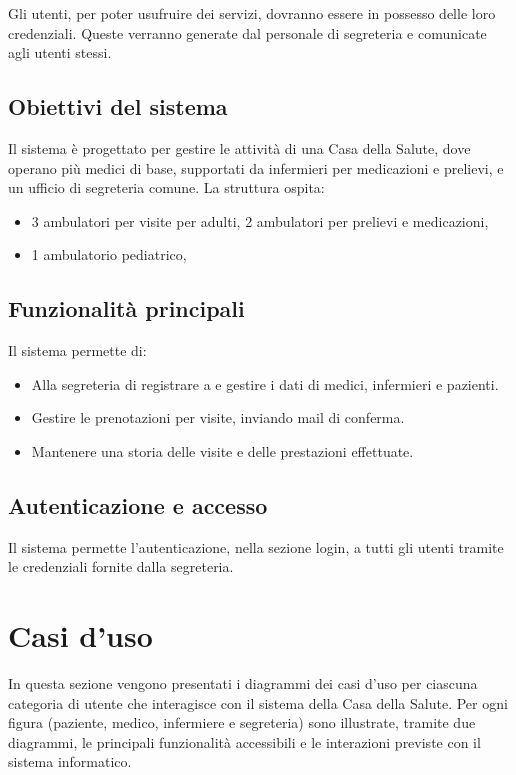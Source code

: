 \documentclass[a4paper,12pt]{article}
\begin{document}
Gli utenti, per poter usufruire dei servizi, dovranno essere in possesso delle loro credenziali. 
Queste verranno generate dal personale di segreteria e comunicate agli utenti stessi.

\subsection{Obiettivi del sistema}

Il sistema è progettato per gestire le attività di una Casa della Salute, 
dove operano più medici di base, supportati da infermieri per medicazioni e prelievi,
 e un ufficio di segreteria comune. La struttura ospita:

\begin{itemize}
    \item 3 ambulatori per visite per adulti, 2 ambulatori per prelievi e medicazioni,
    \item 1 ambulatorio pediatrico,
\end{itemize}

\subsection{Funzionalità principali}

Il sistema permette di:
\begin{itemize}
    \item Alla segreteria di registrare a e gestire i dati di medici, infermieri e pazienti.
    \item Gestire le prenotazioni per visite, inviando mail di conferma.
    \item Mantenere una storia delle visite e delle prestazioni effettuate.
\end{itemize}

\subsection{Autenticazione e accesso}

Il sistema permette l'autenticazione, nella sezione login, a tutti gli utenti tramite le credenziali fornite 
dalla segreteria. 

\newpage

\section{Casi d'uso}

In questa sezione vengono presentati i diagrammi dei casi d'uso per ciascuna categoria di utente che 
interagisce con il sistema della Casa della Salute. Per ogni figura (paziente, medico, infermiere e segreteria) sono illustrate, 
tramite due diagrammi, le principali funzionalità accessibili e le interazioni previste con il sistema informatico.
\end{document}
